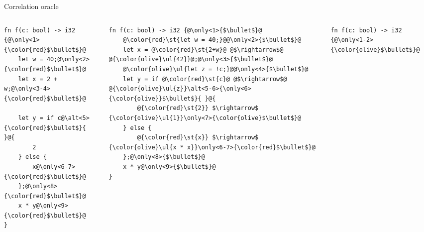 \documentclass{beamer}
\makeatletter
\let\UL\ul
\renewcommand\ul{%
  \let\set@color\beamerorig@set@color
  \let\reset@color\beamerorig@reset@color
  \UL}
\let\ST\st
\renewcommand\st{%
  \let\set@color\beamerorig@set@color
  \let\reset@color\beamerorig@reset@color
  \ST}
\makeatother
\begin{document}
\begin{frame}[fragile]{Correlation oracle}
\begin{columns}
\begin{column}{0.33\textwidth}
\vspace{0.5em}
\begin{lstlisting}[rulecolor=\color{red!20}]
fn f(c: bool) -> i32 {@\only<1>{\color{red}$\bullet$}@
    let w = 40;@\only<2>{\color{red}$\bullet$}@
    let x = 2 + w;@\only<3-4>{\color{red}$\bullet$}@
    
    let y = if c@\alt<5>{\color{red}$\bullet$}{ }@{
        2
    } else {
        x@\only<6-7>{\color{red}$\bullet$}@
    };@\only<8>{\color{red}$\bullet$}@
    x * y@\only<9>{\color{red}$\bullet$}@
}
\end{lstlisting}
\end{column}
\begin{column}{0.33\textwidth}
\vspace{0.5em}
\begin{lstlisting}
fn f(c: bool) -> i32 {@\only<1>{$\bullet$}@
    @\color{red}\st{let w = 40;}@@\only<2>{$\bullet$}@
    let x = @\color{red}\st{2+w}@ @$\rightarrow$@ @{\color{olive}\ul{42}}@;@\only<3>{$\bullet$}@
    @\color{olive}\ul{let z = !c;}@@\only<4>{$\bullet$}@
    let y = if @\color{red}\st{c}@ @$\rightarrow$@ @{\color{olive}\ul{z}}\alt<5-6>{\only<6>{\color{olive}}$\bullet$}{ }@{
        @{\color{red}\st{2}} $\rightarrow$ {\color{olive}\ul{1}}\only<7>{\color{olive}$\bullet$}@
    } else {
        @{\color{red}\st{x}} $\rightarrow$ {\color{olive}\ul{x * x}}\only<6-7>{\color{red}$\bullet$}@
    };@\only<8>{$\bullet$}@
    x * y@\only<9>{$\bullet$}@
}
\end{lstlisting}
\end{column}
\begin{column}{0.33\textwidth}
\vspace{0.5em}
\begin{lstlisting}[rulecolor=\color{olive!20}]
fn f(c: bool) -> i32 {@\only<1-2>{\color{olive}$\bullet$}@
    

\end{lstlisting}
\end{column}
\end{columns}
\end{frame}
\end{document}
